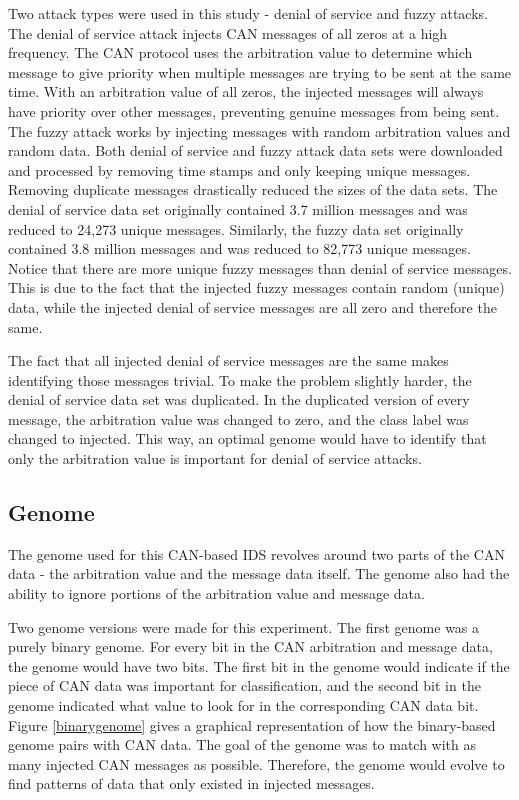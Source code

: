 \documentclass[10pt,conference]{IEEEtran}
\begin{document}
Two attack types were used in this study - denial of service and fuzzy attacks.  The denial of service attack injects CAN messages of all zeros at a high frequency.  The CAN protocol uses the arbitration value to determine which message to give priority when multiple messages are trying to be sent at the same time.  With an arbitration value of all zeros, the injected messages will always have priority over other messages, preventing genuine messages from being sent.  The fuzzy attack works by injecting messages with random arbitration values and random data.  Both denial of service and fuzzy attack data sets were downloaded and processed by removing time stamps and only keeping unique messages.  Removing duplicate messages drastically reduced the sizes of the data sets.  The denial of service data set originally contained 3.7 million messages and was reduced to 24,273 unique messages.  Similarly, the fuzzy data set originally contained 3.8 million messages and was reduced to 82,773 unique messages.  Notice that there are more unique fuzzy messages than denial of service messages.  This is due to the fact that the injected fuzzy messages contain random (unique) data, while the injected denial of service messages are all zero and therefore the same.  

The fact that all injected denial of service messages are the same makes identifying those messages trivial.  To make the problem slightly harder, the denial of service data set was duplicated.  In the duplicated version of every message, the arbitration value was changed to zero, and the class label was changed to injected.  This way, an optimal genome would have to identify that only the arbitration value is important for denial of service attacks.  

\subsection{Genome}

The genome used for this CAN-based IDS revolves around two parts of the CAN data - the arbitration value and the message data itself.  The genome also had the ability to ignore portions of the arbitration value and message data.  

Two genome versions were made for this experiment.  The first genome was a purely binary genome.  For every bit in the CAN arbitration and message data, the genome would have two bits.  The first bit in the genome would indicate if the piece of CAN data was important for classification, and the second bit in the genome indicated what value to look for in the corresponding CAN data bit.  Figure \ref{binarygenome} gives a graphical representation of how the binary-based genome pairs with CAN data.  The goal of the genome was to match with as many injected CAN messages as possible.  Therefore, the genome would evolve to find patterns of data that only existed in injected messages.  
\end{document}
